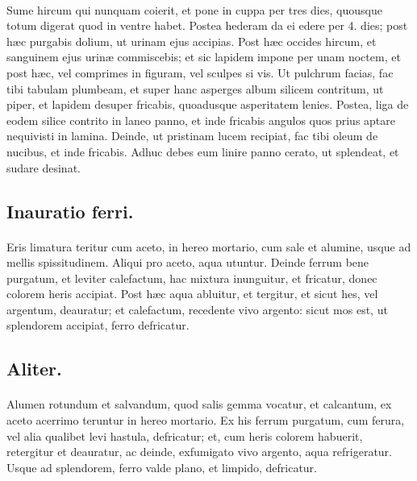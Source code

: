 \documentclass[a4paper, 11pt, oneside, polutonikogreek, italian]{article}
\begin{document}
\paragraph{}
Sume hircum qui nunquam coierit, et pone in cuppa per tres dies, quousque totum digerat quod in ventre habet. Postea hederam da ei edere per 4. dies; post hæc purgabis dolium, ut urinam ejus accipias. Post hæc occides hircum, et sanguinem ejus urinæ commiscebis; et sic lapidem impone per unam noctem, et post hæc, vel comprimes in figuram, vel sculpes si vis. Ut pulchrum facias, fac tibi tabulam plumbeam, et super hanc asperges album silicem contritum, ut piper, et lapidem desuper fricabis, quoadusque asperitatem lenies. Postea, liga de eodem silice contrito in laneo panno, et inde fricabis angulos quos prius aptare nequivisti in lamina. Deinde, ut pristinam lucem recipiat, fac tibi oleum de nucibus, et inde fricabis. Adhuc debes eum linire panno cerato, ut splendeat, et sudare desinat.

\subsection{Inauratio ferri.}
\paragraph{}
Eris limatura teritur cum aceto, in hereo mortario, cum sale et alumine, usque ad mellis spissitudinem. Aliqui pro aceto, aqua utuntur. Deinde ferrum bene purgatum, et leviter calefactum, hac mixtura inunguitur, et fricatur, donec colorem heris accipiat. Post hæc aqua abluitur, et tergitur, et sicut hes, vel argentum, deauratur; et calefactum, recedente vivo argento: sicut mos est, ut splendorem accipiat, ferro defricatur.

\subsection{Aliter.}
\paragraph{}
Alumen rotundum et salvandum, quod salis gemma vocatur, et calcantum, ex aceto acerrimo teruntur in hereo mortario. Ex his ferrum purgatum, cum ferura, vel alia qualibet levi hastula, defricatur; et, cum heris colorem habuerit, retergitur et deauratur, ac deinde, exfumigato vivo argento, aqua refrigeratur. Usque ad splendorem, ferro valde plano, et limpido, defricatur.
\end{document}
